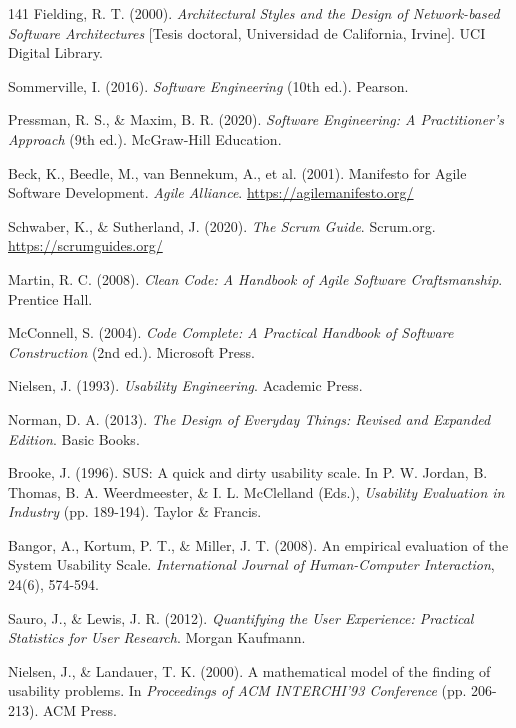 \begin{thebibliography}{141}
Fielding, R. T. (2000). \textit{Architectural Styles and the Design of Network-based Software Architectures} [Tesis doctoral, Universidad de California, Irvine]. UCI Digital Library.


Sommerville, I. (2016). \textit{Software Engineering} (10th ed.). Pearson.

Pressman, R. S., \& Maxim, B. R. (2020). \textit{Software Engineering: A Practitioner's Approach} (9th ed.). McGraw-Hill Education.

Beck, K., Beedle, M., van Bennekum, A., et al. (2001). Manifesto for Agile Software Development. \textit{Agile Alliance}. \url{https://agilemanifesto.org/}

Schwaber, K., \& Sutherland, J. (2020). \textit{The Scrum Guide}. Scrum.org. \url{https://scrumguides.org/}

Martin, R. C. (2008). \textit{Clean Code: A Handbook of Agile Software Craftsmanship}. Prentice Hall.

McConnell, S. (2004). \textit{Code Complete: A Practical Handbook of Software Construction} (2nd ed.). Microsoft Press.


Nielsen, J. (1993). \textit{Usability Engineering}. Academic Press.

Norman, D. A. (2013). \textit{The Design of Everyday Things: Revised and Expanded Edition}. Basic Books.

Brooke, J. (1996). SUS: A quick and dirty usability scale. In P. W. Jordan, B. Thomas, B. A. Weerdmeester, \& I. L. McClelland (Eds.), \textit{Usability Evaluation in Industry} (pp. 189-194). Taylor \& Francis.

Bangor, A., Kortum, P. T., \& Miller, J. T. (2008). An empirical evaluation of the System Usability Scale. \textit{International Journal of Human-Computer Interaction}, 24(6), 574-594.

Sauro, J., \& Lewis, J. R. (2012). \textit{Quantifying the User Experience: Practical Statistics for User Research}. Morgan Kaufmann.

Nielsen, J., \& Landauer, T. K. (2000). A mathematical model of the finding of usability problems. In \textit{Proceedings of ACM INTERCHI'93 Conference} (pp. 206-213). ACM Press.


\end{thebibliography}
